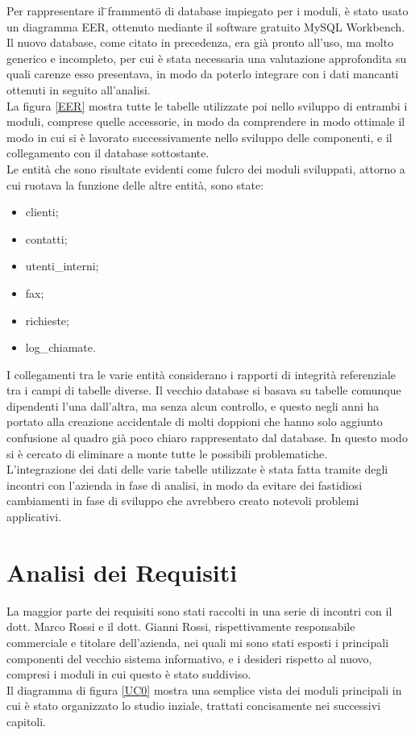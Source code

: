 \noindent
Per rappresentare il \"{}frammento\"{} di database impiegato per i moduli, \`e stato usato un diagramma EER, ottenuto mediante il software gratuito MySQL Workbench. \\
Il nuovo database, come citato in precedenza, era gi\`a pronto all'uso, ma molto generico e incompleto, per cui \`e stata necessaria una valutazione approfondita su quali carenze esso presentava, in modo da poterlo integrare con i dati mancanti ottenuti in seguito all'analisi. \\
La figura \ref{EER} mostra tutte le tabelle utilizzate poi nello sviluppo di entrambi i moduli, comprese quelle accessorie, in modo da comprendere in modo ottimale il modo in cui si \`e lavorato successivamente nello sviluppo delle componenti, e il collegamento con il database sottostante. \\
Le entit\`a che sono risultate evidenti come fulcro dei moduli sviluppati, attorno a cui ruotava la funzione delle altre entit\`a, sono state:
\begin{itemize}
  \item clienti;
  \item contatti;
  \item utenti\_interni;
  \item fax;
  \item richieste;
  \item log\_chiamate.
\end{itemize}
\noindent
I collegamenti tra le varie entit\`a considerano i rapporti di integrit\`a referenziale tra i campi di tabelle diverse. Il vecchio database si basava su tabelle comunque dipendenti l'una dall'altra, ma senza alcun controllo, e questo negli anni ha portato alla creazione accidentale di molti doppioni che hanno solo aggiunto confusione al quadro gi\`a poco chiaro rappresentato dal database. In questo modo si \`e cercato di eliminare a monte tutte le possibili problematiche. \\
L'integrazione dei dati delle varie tabelle utilizzate \`e stata fatta tramite degli incontri con l'azienda in fase di analisi, in modo da evitare dei fastidiosi cambiamenti in fase di sviluppo che avrebbero creato notevoli problemi applicativi.

\newpage
\section{Analisi dei Requisiti}
La maggior parte dei requisiti sono stati raccolti in una serie di incontri con il dott. Marco Rossi e il dott. Gianni Rossi, rispettivamente responsabile commerciale e titolare dell'azienda, nei quali mi sono stati esposti i principali componenti del vecchio sistema informativo, e i desideri rispetto al nuovo, compresi i moduli in cui questo \`e stato suddiviso. \\
Il diagramma di figura \ref{UC0} mostra una semplice vista dei moduli principali in cui \`e stato organizzato lo studio inziale, trattati concisamente nei successivi capitoli.

